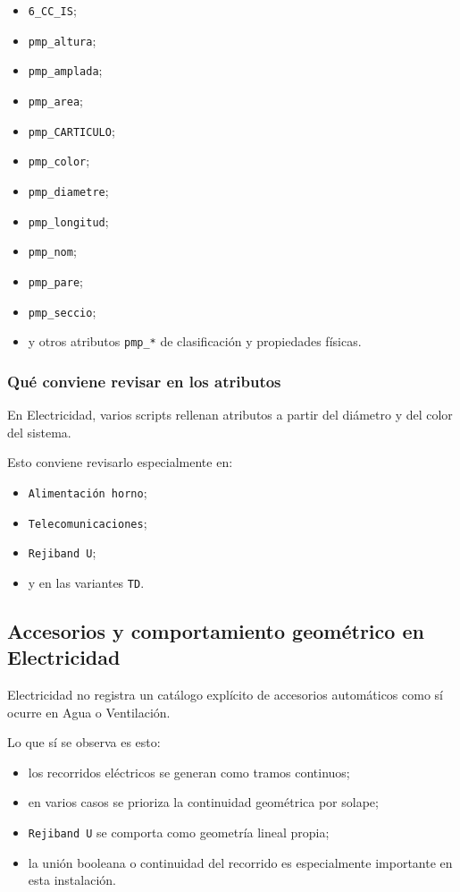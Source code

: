 \documentclass[12pt,a4paper]{article}
\begin{document}
\begin{itemize}
\item \texttt{6\_CC\_IS};
\item \texttt{pmp\_altura};
\item \texttt{pmp\_amplada};
\item \texttt{pmp\_area};
\item \texttt{pmp\_CARTICULO};
\item \texttt{pmp\_color};
\item \texttt{pmp\_diametre};
\item \texttt{pmp\_longitud};
\item \texttt{pmp\_nom};
\item \texttt{pmp\_pare};
\item \texttt{pmp\_seccio};
\item y otros atributos \texttt{pmp\_*} de clasificación y propiedades físicas.
\end{itemize}

\subsubsection{Qué conviene revisar en los atributos}

En Electricidad, varios scripts rellenan atributos a partir del diámetro y del color del sistema.

Esto conviene revisarlo especialmente en:

\begin{itemize}
\item \texttt{Alimentación horno};
\item \texttt{Telecomunicaciones};
\item \texttt{Rejiband U};
\item y en las variantes \texttt{TD}.
\end{itemize}

\subsection{Accesorios y comportamiento geométrico en Electricidad}

Electricidad no registra un catálogo explícito de accesorios automáticos como sí ocurre en Agua o Ventilación.

Lo que sí se observa es esto:

\begin{itemize}
\item los recorridos eléctricos se generan como tramos continuos;
\item en varios casos se prioriza la continuidad geométrica por solape;
\item \texttt{Rejiband U} se comporta como geometría lineal propia;
\item la unión booleana o continuidad del recorrido es especialmente importante en esta instalación.
\end{itemize}
\end{document}
